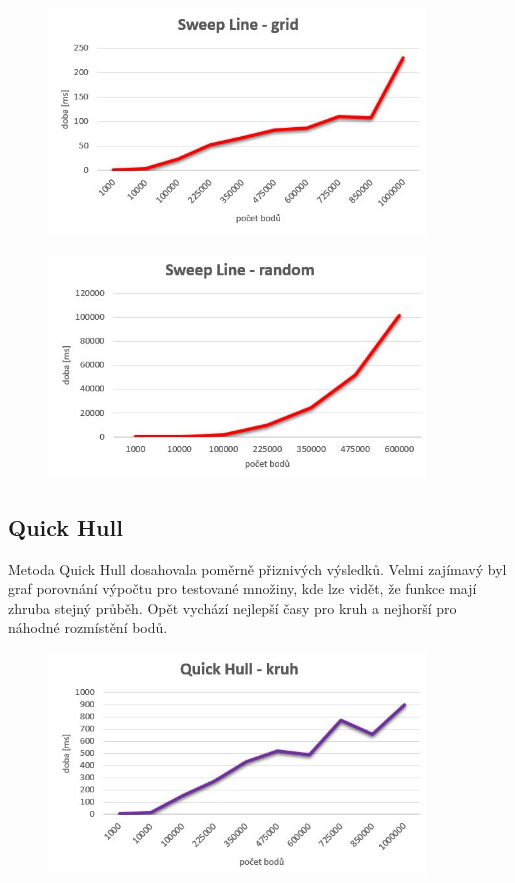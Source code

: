 \documentclass[a4paper, 12pt]{article}
\begin{document}
\begin{figure}[h!]
	\centering
	\includegraphics[width=10cm]{sweep_grid.jpg}
\end{figure}


\begin{figure}[h!]
	\centering
	\includegraphics[width=10cm]{sweep_random.jpg}
\end{figure}
\clearpage

\subsection{Quick Hull}
Metoda Quick Hull dosahovala poměrně přiznivých výsledků. Velmi zajímavý byl graf porovnání výpočtu pro testované množiny, kde lze vidět, že funkce mají zhruba stejný průběh. Opět vychází nejlepší časy pro kruh a nejhorší pro náhodné rozmístění bodů.

\begin{figure}[h!]
	\centering
	\includegraphics[width=10cm]{quickhull_kruh.jpg}
\end{figure}
\end{document}

